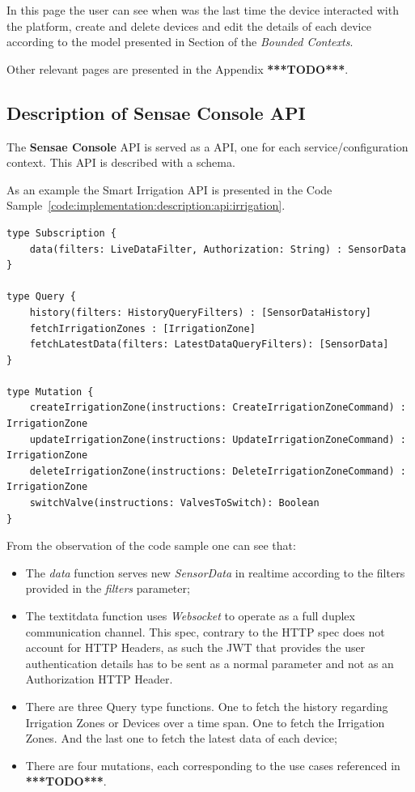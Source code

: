 In this page the user can see when was the last time the device interacted with the platform, create and delete devices and edit the details of each device according to the model presented in Section of the \textit{Bounded Contexts}.

Other relevant pages are presented in the Appendix \textbf{***TODO***}.

\subsection{Description of Sensae Console API}
\label{subsec:implementation:description:api}

The \textbf{Sensae Console} \gls{API} is served as a  \gls{API}, one for each service/configuration context. This \gls{API} is described with a schema.

As an example the Smart Irrigation API is presented in the Code Sample~\ref{code:implementation:description:api:irrigation}. 

\begin{lstlisting}[caption=Smart Irrigation API Schema, label={code:implementation:description:api:irrigation}]
type Subscription {
    data(filters: LiveDataFilter, Authorization: String) : SensorData
}

type Query {
    history(filters: HistoryQueryFilters) : [SensorDataHistory]
    fetchIrrigationZones : [IrrigationZone]
    fetchLatestData(filters: LatestDataQueryFilters): [SensorData]
}

type Mutation {
    createIrrigationZone(instructions: CreateIrrigationZoneCommand) : IrrigationZone
    updateIrrigationZone(instructions: UpdateIrrigationZoneCommand) : IrrigationZone
    deleteIrrigationZone(instructions: DeleteIrrigationZoneCommand) : IrrigationZone
    switchValve(instructions: ValvesToSwitch): Boolean
}        
\end{lstlisting}

From the observation of the code sample one can see that:

\begin{itemize}
    \item The \textit{data} function serves new \textit{SensorData} in realtime according to the filters provided in the \textit{filters} parameter;
    \item The textit{data} function uses \textit{Websocket} to operate as a full duplex communication channel. This spec, contrary to the HTTP spec does not account for HTTP Headers, as such the \gls{JWT} that provides the user authentication details has to be sent as a normal parameter and not as an Authorization HTTP Header.
    \item  There are three Query type functions. One to fetch the history regarding Irrigation Zones or Devices over a time span. One to fetch the Irrigation Zones. And the last one to fetch the latest data of each device;
    \item There are four mutations, each corresponding to the use cases referenced in \textbf{***TODO***}.
\end{itemize}

